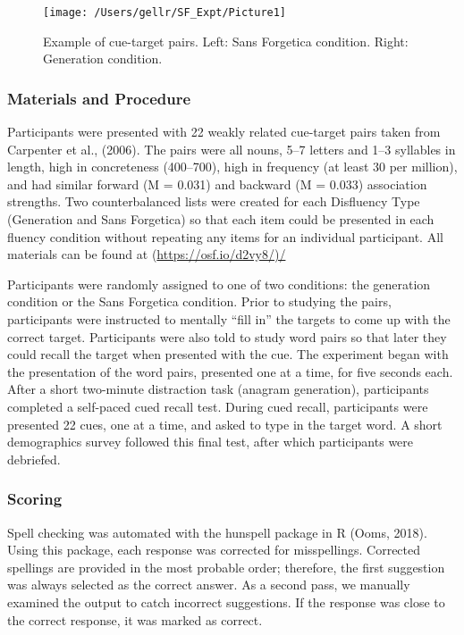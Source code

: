 \documentclass[jou]{apa6}
\begin{document}
\begin{figure}

{\centering \texttt{[image: /Users/gellr/SF\_Expt/Picture1]} 

}

\caption{Example of cue-target pairs. Left: Sans Forgetica condition. Right: Generation condition.}\label{fig:unnamed-chunk-1}
\end{figure}

\hypertarget{materials-and-procedure}{%
\subsubsection{Materials and Procedure}\label{materials-and-procedure}}

Participants were presented with 22 weakly related cue-target pairs taken from Carpenter et al., (2006). The pairs were all nouns, 5--7 letters and 1--3 syllables in length, high in concreteness (400--700), high in frequency (at least 30 per million), and had similar forward (M = 0.031) and backward (M = 0.033) association strengths. Two counterbalanced lists were created for each Disfluency Type (Generation and Sans Forgetica) so that each item could be presented in each fluency condition without repeating any items for an individual participant. All materials can be found at (\url{https://osf.io/d2vy8/)/}

Participants were randomly assigned to one of two conditions: the generation condition or the Sans Forgetica condition. Prior to studying the pairs, participants were instructed to mentally \enquote{fill in} the targets to come up with the correct target. Participants were also told to study word pairs so that later they could recall the target when presented with the cue. The experiment began with the presentation of the word pairs, presented one at a time, for five seconds each. After a short two-minute distraction task (anagram generation), participants completed a self-paced cued recall test. During cued recall, participants were presented 22 cues, one at a time, and asked to type in the target word. A short demographics survey followed this final test, after which participants were debriefed.

\hypertarget{scoring}{%
\subsubsection{Scoring}\label{scoring}}

Spell checking was automated with the hunspell package in R (Ooms, 2018). Using this package, each response was corrected for misspellings. Corrected spellings are provided in the most probable order; therefore, the first suggestion was always selected as the correct answer. As a second pass, we manually examined the output to catch incorrect suggestions. If the response was close to the correct response, it was marked as correct.
\end{document}
